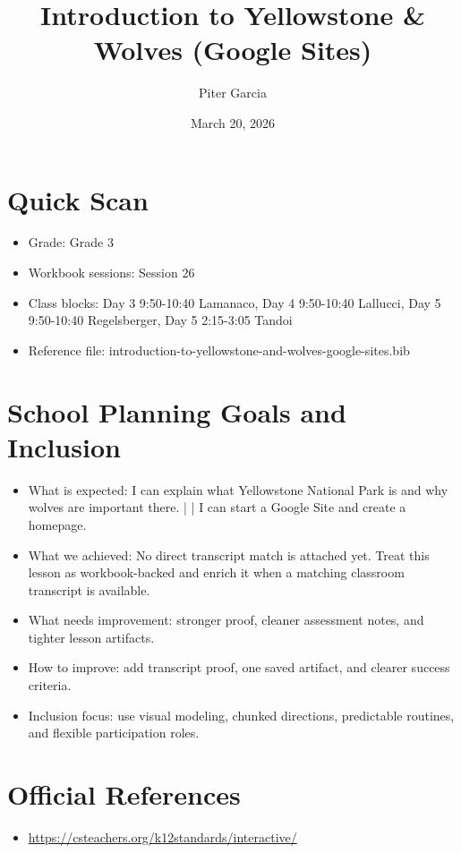 \documentclass[11pt]{article}
\title{Introduction to Yellowstone & Wolves (Google Sites)}
\author{Piter Garcia}
\date{March 20, 2026}
\begin{document}
\maketitle
\section*{Quick Scan}
\begin{itemize}[leftmargin=*]
\item Grade: Grade 3
\item Workbook sessions: Session 26
\item Class blocks: Day 3 9:50-10:40 Lamanaco, Day 4 9:50-10:40 Lallucci, Day 5 9:50-10:40 Regelsberger, Day 5 2:15-3:05 Tandoi
\item Reference file: introduction-to-yellowstone-and-wolves-google-sites.bib
\end{itemize}
\section*{School Planning Goals and Inclusion}
\begin{itemize}[leftmargin=*]
\item What is expected: I can explain what Yellowstone National Park is and why wolves are important there. | | I can start a Google Site and create a homepage.
\item What we achieved: No direct transcript match is attached yet. Treat this lesson as workbook-backed and enrich it when a matching classroom transcript is available.
\item What needs improvement: stronger proof, cleaner assessment notes, and tighter lesson artifacts.
\item How to improve: add transcript proof, one saved artifact, and clearer success criteria.
\item Inclusion focus: use visual modeling, chunked directions, predictable routines, and flexible participation roles.
\end{itemize}
\section*{Official References}
\begin{itemize}[leftmargin=*]
\item \url{https://csteachers.org/k12standards/interactive/}

\end{itemize}
\end{document}
